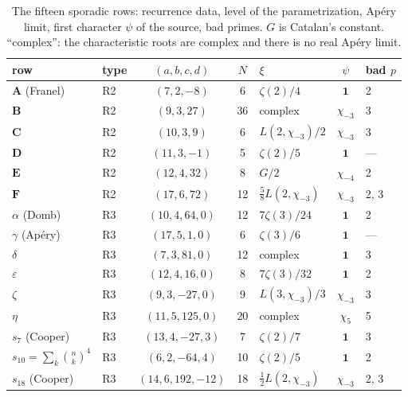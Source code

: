 \documentclass[11pt]{amsart}
\theoremstyle{definition}
\theoremstyle{remark}
\begin{document}
\begin{table}[ht]
\caption{The fifteen sporadic rows: recurrence data, level of the parametrization, Ap\'ery limit, first character $\psi$ of the source, bad primes. $G$ is Catalan's constant. ``complex'': the characteristic roots are complex and there is no real Ap\'ery limit.}\label{tab:rows}
\small\renewcommand{\arraystretch}{1.15}
\begin{tabular}{@{}llcclcl@{}}\toprule
row & type & $(a,b,c,d)$ & $N$ & $\xi$ & $\psi$ & bad $p$\\\midrule
$\mathbf A$ (Franel) & R2 & $(7,2,-8)$ & 6 & $\zeta(2)/4$ & $\mathbf 1$ & 2\\
$\mathbf B$ & R2 & $(9,3,27)$ & 36 & complex & $\chi_{-3}$ & 3\\
$\mathbf C$ & R2 & $(10,3,9)$ & 6 & $L(2,\chi_{-3})/2$ & $\chi_{-3}$ & 3\\
$\mathbf D$ & R2 & $(11,3,-1)$ & 5 & $\zeta(2)/5$ & $\mathbf 1$ & ---\\
$\mathbf E$ & R2 & $(12,4,32)$ & 8 & $G/2$ & $\chi_{-4}$ & 2\\
$\mathbf F$ & R2 & $(17,6,72)$ & 12 & $\tfrac58L(2,\chi_{-3})$ & $\chi_{-3}$ & 2, 3\\
$\alpha$ (Domb) & R3 & $(10,4,64,0)$ & 12 & $7\zeta(3)/24$ & $\mathbf 1$ & 2\\
$\gamma$ (Ap\'ery) & R3 & $(17,5,1,0)$ & 6 & $\zeta(3)/6$ & $\mathbf 1$ & ---\\
$\delta$ & R3 & $(7,3,81,0)$ & 12 & complex & $\mathbf 1$ & 3\\
$\varepsilon$ & R3 & $(12,4,16,0)$ & 8 & $7\zeta(3)/32$ & $\mathbf 1$ & 2\\
$\zeta$ & R3 & $(9,3,-27,0)$ & 9 & $L(3,\chi_{-3})/3$ & $\chi_{-3}$ & 3\\
$\eta$ & R3 & $(11,5,125,0)$ & 20 & complex & $\chi_5$ & 5\\
$s_7$ (Cooper) & R3 & $(13,4,-27,3)$ & 7 & $\zeta(2)/7$ & $\mathbf 1$ & 3\\
$s_{10}=\sum_k\binom nk^4$ & R3 & $(6,2,-64,4)$ & 10 & $\zeta(2)/5$ & $\mathbf 1$ & 2\\
$s_{18}$ (Cooper) & R3 & $(14,6,192,-12)$ & 18 & $\tfrac12L(2,\chi_{-3})$ & $\chi_{-3}$ & 2, 3\\\bottomrule
\end{tabular}
\end{table}
\end{document}
